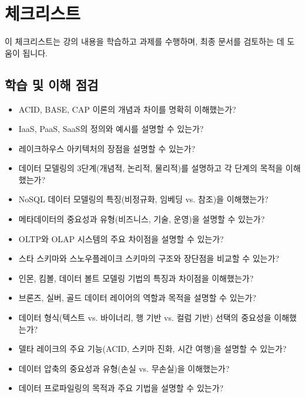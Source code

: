 \documentclass[11pt,a4paper]{article}
\theoremstyle{definition}
\begin{document}
\newpage
\section{체크리스트}

이 체크리스트는 강의 내용을 학습하고 과제를 수행하며, 최종 문서를 검토하는 데 도움이 됩니다.

\subsection{학습 및 이해 점검}
\begin{itemize}
    \item [ ] ACID, BASE, CAP 이론의 개념과 차이를 명확히 이해했는가?
    \item [ ] IaaS, PaaS, SaaS의 정의와 예시를 설명할 수 있는가?
    \item [ ] 레이크하우스 아키텍처의 장점을 설명할 수 있는가?
    \item [ ] 데이터 모델링의 3단계(개념적, 논리적, 물리적)를 설명하고 각 단계의 목적을 이해했는가?
    \item [ ] NoSQL 데이터 모델링의 특징(비정규화, 임베딩 vs. 참조)을 이해했는가?
    \item [ ] 메타데이터의 중요성과 유형(비즈니스, 기술, 운영)을 설명할 수 있는가?
    \item [ ] OLTP와 OLAP 시스템의 주요 차이점을 설명할 수 있는가?
    \item [ ] 스타 스키마와 스노우플레이크 스키마의 구조와 장단점을 비교할 수 있는가?
    \item [ ] 인몬, 킴볼, 데이터 볼트 모델링 기법의 특징과 차이점을 이해했는가?
    \item [ ] 브론즈, 실버, 골드 데이터 레이어의 역할과 목적을 설명할 수 있는가?
    \item [ ] 데이터 형식(텍스트 vs. 바이너리, 행 기반 vs. 컬럼 기반) 선택의 중요성을 이해했는가?
    \item [ ] 델타 레이크의 주요 기능(ACID, 스키마 진화, 시간 여행)을 설명할 수 있는가?
    \item [ ] 데이터 압축의 중요성과 유형(손실 vs. 무손실)을 이해했는가?
    \item [ ] 데이터 프로파일링의 목적과 주요 기법을 설명할 수 있는가?
\end{itemize}
\end{document}
